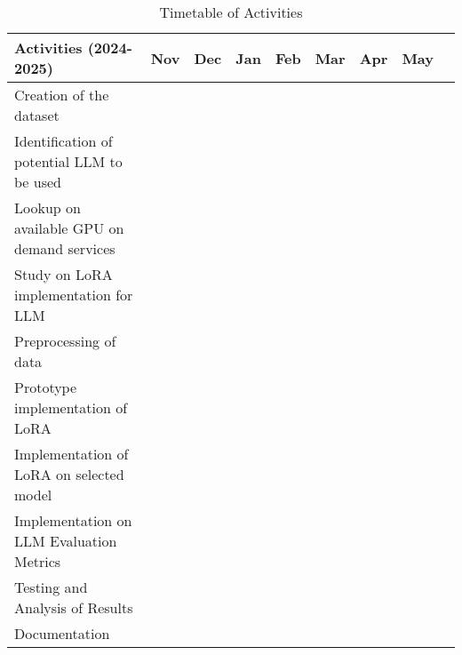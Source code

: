 	
	\begin{table}[ht]  
		\centering
		\caption{Timetable of Activities} \vspace{0.25em}
		\begin{tabular}{|p{2in}|c|c|c|c|c|c|c|c|} \hline
			\centering Activities (2024-2025) 
			& Nov & Dec & Jan & Feb & Mar & Apr & May \\ \hline
			
			Creation of the dataset      
			&\weekone~~~ & & & & & &  \\ \hline
			
			Identification of potential LLM to be used 
			&\weekone~~~ & & & &  &  &  \\ \hline
			
			Lookup on available GPU on demand services     
			&\weekone~~~ & & & &  & &   \\ \hline
			
			Study on LoRA implementation for LLM     
			& ~\weekone & & & &  &  &  \\ \hline
			
			Preprocessing of data      
			& ~\weekthree & & & &  & &  \\ \hline
			
			Prototype implementation of LoRA 
			&~~~\weekone & \weekfour & & &  & &   \\ \hline
			
			Implementation of LoRA on selected model 
			& & &\weektwo~~ & &  &  &  \\ \hline
			
			Implementation on LLM Evaluation Metrics 
			& & &\weektwo  & &  &  &  \\ \hline
			
			Testing and Analysis of Results 
			& & & & \weekfour & &  &   \\ \hline
			
			Documentation 
			& ~~\weektwo  & \weekfour & \weekfour & \weekfour & \weekfour & &  \\ \hline
			
		\end{tabular}
		\label{tab:timetableactivities}
	\end{table}